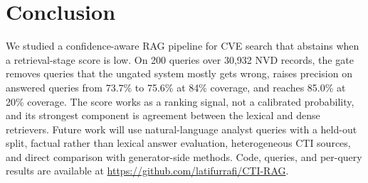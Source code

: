 \documentclass[conference]{IEEEtran}
\begin{document}
\section{Conclusion}
\label{sec:conclusion}
We studied a confidence-aware RAG pipeline for CVE search that abstains
when a retrieval-stage score is low. On 200 queries over 30{,}932 NVD
records, the gate removes queries that the ungated system mostly gets
wrong, raises precision on answered queries from 73.7\% to 75.6\% at
84\% coverage, and reaches 85.0\% at 20\% coverage. The score works as a
ranking signal, not a calibrated probability, and its strongest component
is agreement between the lexical and dense retrievers. Future work will
use natural-language analyst queries with a held-out split, factual rather
than lexical answer evaluation, heterogeneous CTI sources, and direct
comparison with generator-side methods. Code, queries, and per-query
results are available at \url{https://github.com/latifurrafi/CTI-RAG}.
\end{document}
